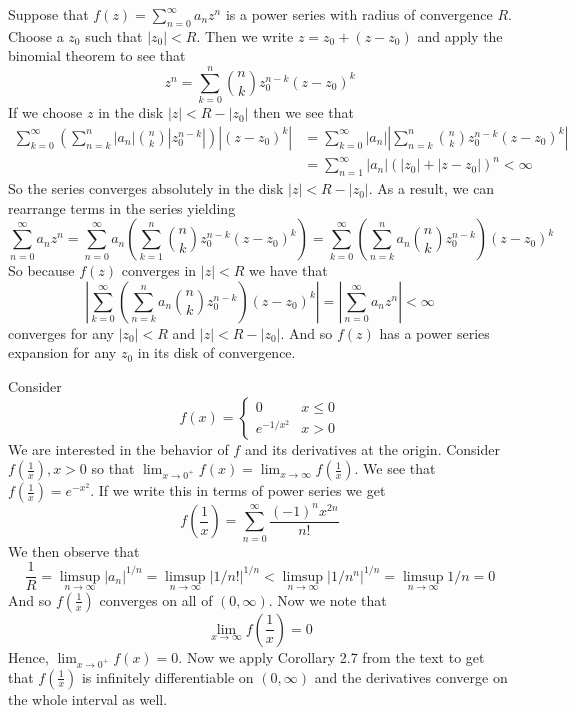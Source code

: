 \documentclass{article}
\newcommand{\exercise}[1]{\noindent{\textbf{Exercise #1:}}}
\begin{document}
\exercise{1.4.18}

Suppose that $f(z) = \sum_{n=0}^\infty a_nz^n$ is a power series with
radius of convergence $R$. Choose a $z_0$ such that $|z_0| < R$. Then
we write $z = z_0 + (z-z_0)$ and apply the binomial theorem to see that
\[
z^n = \sum_{k=0}^n \binom{n}{k}z_0^{n-k}(z-z_0)^k
\]
If we choose $z$ in the disk $|z| < R - |z_0|$ then we see that
\begin{align*}
  \sum_{k=0}^\infty\left(\sum_{n=k}^n
    |a_n|\binom{n}{k}|z_0^{n-k}|\right)|(z-z_0)^k| &=
  \sum_{k=0}^\infty|a_n|\left|\sum_{n=k}^n
    \binom{n}{k}z_0^{n-k}(z-z_0)^k\right| \\
  &= \sum_{n=1}^\infty |a_n| (|z_0| + |z - z_0|)^n < \infty
\end{align*}
So the series converges absolutely in the disk $|z| < R - |z_0|$. As a
result, we can rearrange terms in the series yielding
\[
\sum_{n=0}^\infty a_nz^n = \sum_{n=0}^\infty a_n\left(\sum_{k=1}^n
  \binom{n}{k}z_0^{n-k}(z-z_0)^k\right) = \sum_{k=0}^\infty
\left(\sum_{n=k}^n a_n\binom{n}{k}z_0^{n-k}\right)(z-z_0)^k
\]
So because $f(z)$ converges in $|z| < R$ we have that
\[
\left|\sum_{k=0}^\infty \left(\sum_{n=k}^n
    a_n\binom{n}{k}z_0^{n-k}\right)(z-z_0)^k\right| =
\left|\sum_{n=0}^\infty a_nz^n\right| < \infty
\]
converges for any $|z_0| < R$ and $|z| < R - |z_0|$. And so $f(z)$ has
a power series expansion for any $z_0$ in its disk of convergence.

\exercise{1.4.23}

Consider
\[
f(x) =
\begin{cases}
  0 & x \leq 0 \\
  e^{-1/x^2} & x > 0
\end{cases}
\]
We are interested in the behavior of $f$ and its derivatives at the
origin. Consider $f(\frac{1}{x}), x > 0$ so that $\lim_{x\to 0^+}f(x)
= \lim_{x\to\infty}f(\frac{1}{x})$. We see that $f(\frac{1}{x}) =
e^{-x^2}$. If we write this in terms of power series we get
\[
f\left(\frac{1}{x}\right) = \sum_{n=0}^\infty \frac{(-1)^nx^{2n}}{n!}
\]
We then observe that
\[
\frac{1}{R} = \limsup_{n\to\infty}|a_n|^{1/n} =
\limsup_{n\to\infty}|1/n!|^{1/n} < \limsup_{n\to\infty}|1/n^n|^{1/n} =
\limsup_{n\to\infty}1/n = 0
\]
And so $f(\frac{1}{x})$ converges on all of $(0,\infty)$. Now we note that
\[
\lim_{x\to\infty} f\left(\frac{1}{x}\right) = 0
\]
Hence, $\lim_{x\to 0^+}f(x) = 0$. Now we apply Corollary 2.7 from the
text to get that $f(\frac{1}{x})$ is infinitely differentiable on $(0,
\infty)$ and the derivatives converge on the whole interval as
well.
\end{document}
